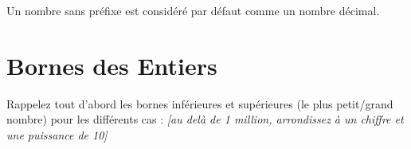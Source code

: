 \documentclass[11pt,a4paper]{article}
\begin{document}
\smallskip

Un nombre sans préfixe est considéré par défaut comme un nombre décimal.

\bigskip


\section{Bornes des Entiers}


\medskip

Rappelez tout d'abord les bornes inférieures et supérieures (le plus petit/grand nombre) pour les différents cas : \textit{[au delà de 1 million, arrondissez à un chiffre et une puissance de 10]}

\medskip
\end{document}

